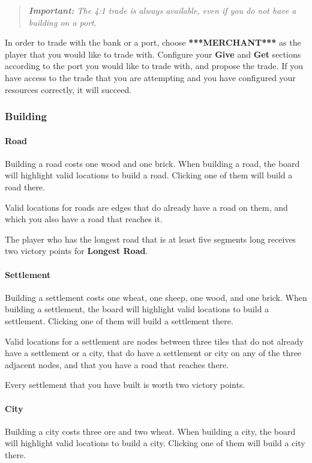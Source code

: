 \documentclass[12pt,letterpaper,titlepage]{article}
\newcommand\note[1]{\begin{quote}\emph{\textbf{Important:} #1}\end{quote}}
\begin{document}
			\note{The 4:1 trade is always available, even if you do not have a building on a port.}
		
			In order to trade with the bank or a port, choose \textbf{***MERCHANT***} as the player that you would like to trade with. Configure your \textbf{Give} and \textbf{Get} sections according to the port you would like to trade with, and propose the trade. If you have access to the trade that you are attempting and you have configured your resources correctly, it will succeed.

		\subsubsection{Building}
			\paragraph{Road}
			Building a road costs one wood and one brick. When building a road, the board will highlight valid locations to build a road. Clicking one of them will build a road there.
			
			Valid locations for roads are edges that do already have a road on them, and which you also have a road that reaches it.
			
			The player who has the longest road that is at least five segments long receives two victory points for \textbf{Longest Road}.

			\paragraph{Settlement}
			Building a settlement costs one wheat, one sheep, one wood, and one brick. When building a settlement, the board will highlight valid locations to build a settlement. Clicking one of them will build a settlement there.
			
			Valid locations for a settlement are nodes between three tiles that do not already have a settlement or a city, that do have a settlement or city on any of the three adjacent nodes, and that you have a road that reaches there.

			Every settlement that you have built is worth two victory points.
			
			\paragraph{City}
			Building a city costs three ore and two wheat. When building a city, the board will highlight valid locations to build a city. Clicking one of them will build a city there.
			
\end{document}
